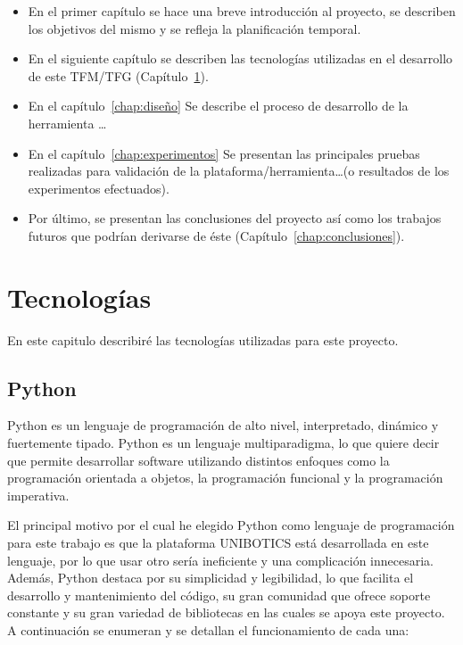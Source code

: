 \documentclass[a4paper, 12pt]{book}
\begin{document}
    \begin{itemize}
      \item En el primer capítulo se hace una breve introducción al proyecto, se describen los objetivos del mismo y se refleja la planificación temporal.
      \item En el siguiente capítulo se describen las tecnologías utilizadas en el desarrollo de este TFM/TFG (Capítulo~\ref{chap:tecnologias}).
      \item En el capítulo~\ref{chap:diseño} Se describe el proceso de desarrollo
      de la herramienta \ldots
      \item En el capítulo~\ref{chap:experimentos} Se presentan las principales pruebas realizadas
      para validación de la plataforma/herramienta\ldots (o resultados de los experimentos
      efectuados).
      \item Por último, se presentan las conclusiones del proyecto así como los trabajos futuros que podrían derivarse de éste (Capítulo~\ref{chap:conclusiones}).
    \end{itemize}

\cleardoublepage


\chapter{Tecnologías}               %
\label{chap:tecnologias}

En este capitulo describiré las tecnologías utilizadas para este proyecto.


\section{Python}
\label{sec:python}

Python es un lenguaje de programación de alto nivel, interpretado, dinámico y fuertemente tipado. Python es un lenguaje multiparadigma, lo que quiere decir que permite desarrollar software utilizando distintos enfoques como la programación orientada a objetos, la programación funcional y la programación imperativa.

El principal motivo por el cual he elegido Python como lenguaje de programación para este trabajo es que la plataforma UNIBOTICS está desarrollada en este lenguaje, por lo que usar otro sería ineficiente y una complicación innecesaria. Además, Python destaca por su simplicidad y legibilidad, lo que facilita el desarrollo y mantenimiento del código, su gran comunidad que ofrece soporte constante y su gran variedad de bibliotecas en las cuales se apoya este proyecto. A continuación se enumeran y se detallan el funcionamiento de cada una:
\end{document}
